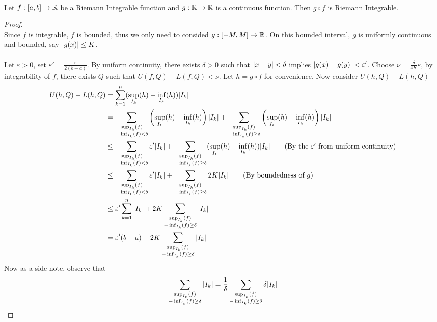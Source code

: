 \documentclass[a4paper]{article}
\begin{document}
\begin{thm}{}{}\\ Let $f:[a,b]\to\mathbb{R}$ be a Riemann Integrable function and $g:\mathbb{R}\to\mathbb{R}$ is a continuous function. Then $g\circ f$ is Riemann Integrable. 
\begin{proof}\\ Since $f$ is integrable, $f$ is bounded, thus we only need to consided $g:[-M,M]\to\mathbb{R}$. On this bounded interval, $g$ is uniformly continuous and bounded, say $\abs{g(x)}\leq K$. \\~\\
Let $\varepsilon>0$, set $\varepsilon'=\frac{\varepsilon}{2(b-a)}$. By uniform continuity, there exists $\delta>0$ such that $\abs{x-y}<\delta$ implies $\abs{g(x)-g(y)}<\varepsilon'$. Choose $\nu=\frac{\delta}{4K}\varepsilon$, by integrability of $f$, there exists $Q$ such that $U(f,Q)-L(f,Q)<\nu$. Let $h=g\circ f$ for convenience. Now consider $U(h,Q)-L(h,Q)$
\begin{align*}
U(h,Q)-L(h,Q)&=\sum_{k=1}^n(\sup_{I_k}(h)-\inf_{I_k}(h))\abs{I_k}\\
&=\sum_{\substack{\sup_{I_k}(f)\\-\inf_{I_k}(f)<\delta}}\left(\sup_{I_k}(h)-\inf_{I_k}(h)\right)\abs{I_k}+\sum_{\substack{\sup_{I_k}(f)\\-\inf_{I_k}(f)\geq\delta}}\left(\sup_{I_k}(h)-\inf_{I_k}(h)\right)\abs{I_k}\\
&\leq\sum_{\substack{\sup_{I_k}(f)\\-\inf_{I_k}(f)<\delta}}\varepsilon'\abs{I_k}+\sum_{\substack{\sup_{I_k}(f)\\-\inf_{I_k}(f)\geq\delta}}(\sup_{I_k}(h)-\inf_{I_k}(h))\abs{I_k}\tag{By the $\varepsilon'$ from uniform continuity}\\
&\leq\sum_{\substack{\sup_{I_k}(f)\\-\inf_{I_k}(f)<\delta}}\varepsilon'\abs{I_k}+\sum_{\substack{\sup_{I_k}(f)\\-\inf_{I_k}(f)\geq\delta}}2K\abs{I_k}\tag{By boundedness of $g$}\\
&\leq\varepsilon'\sum_{k=1}^n\abs{I_k}+2K\sum_{\substack{\sup_{I_k}(f)\\-\inf_{I_k}(f)\geq\delta}}\abs{I_k}\\
&=\varepsilon'(b-a)+2K\sum_{\substack{\sup_{I_k}(f)\\-\inf_{I_k}(f)\geq\delta}}\abs{I_k}
\end{align*}
Now as a side note, observe that
\begin{align*}
\sum_{\substack{\sup_{I_k}(f)\\-\inf_{I_k}(f)\geq\delta}}\abs{I_k}&=\frac{1}{\delta}\sum_{\substack{\sup_{I_k}(f)\\-\inf_{I_k}(f)\geq\delta}}\delta\abs{I_k}\\

\end{align*}
\end{proof}
\end{thm}
\end{document}
